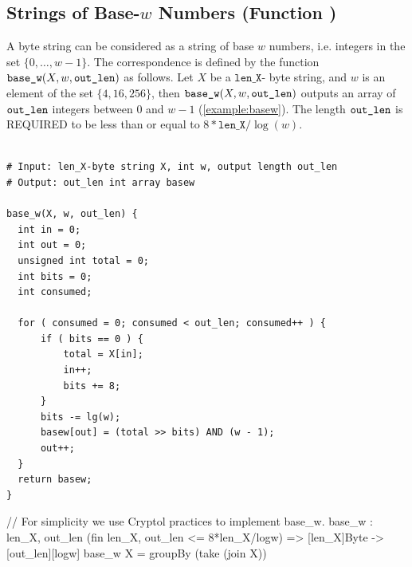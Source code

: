 \subsection{Strings of Base-$w$ Numbers (Function \basew)}\label{func:basew}

   A byte string can be considered as a string of base $w$ numbers, i.e.
   integers in the set $\{0, \ldots , w - 1\}$.  The correspondence is defined
   by the function $\texttt{base\_w}(X, w, \texttt{out\_len})$ as follows.  Let $X$ be a $\texttt{len\_X}$-
   byte string, and $w$ is an element of the set $\{4, 16, 256\}$, then $\texttt{base\_w}(X, w,
   \texttt{out\_len})$ outputs an array of $\texttt{out\_len}$ integers between $0$ and $w - 1$ (\autoref{example:basew}).
   The length $\texttt{out\_len}$ is REQUIRED to be less than or equal to $8 * \texttt{len\_X}
   / \log(w)$.

\begin{lstlisting}[label=alg:basew, language=pseudoc,
                   caption=\basew \ -- Computing the base-$w$ representation]

# Input: len_X-byte string X, int w, output length out_len
# Output: out_len int array basew

base_w(X, w, out_len) {
  int in = 0;
  int out = 0;
  unsigned int total = 0;
  int bits = 0;
  int consumed;

  for ( consumed = 0; consumed < out_len; consumed++ ) {
      if ( bits == 0 ) {
          total = X[in];
          in++;
          bits += 8;
      }
      bits -= lg(w);
      basew[out] = (total >> bits) AND (w - 1);
      out++;
  }
  return basew;
}
\end{lstlisting}

\begin{code}
  // For simplicity we use Cryptol practices to implement base_w.
  base_w : {len_X, out_len} (fin len_X, out_len <= 8*len_X/logw) =>
    [len_X]Byte -> [out_len][logw]
  base_w X = groupBy (take (join X))
\end{code}

